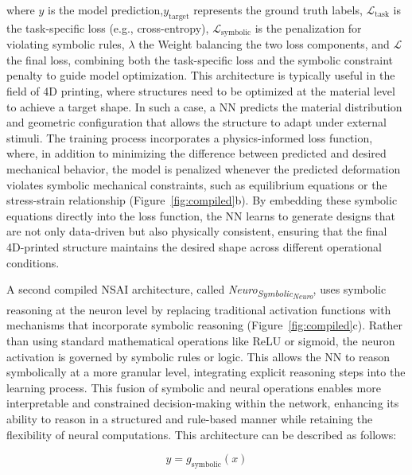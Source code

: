 \documentclass[12pt]{article}
\begin{document}
\noindent where $y$ is the model prediction,$y_\text{target}$ represents the ground truth labels, $\mathcal{L}_\text{task}$ is the task-specific loss (e.g., cross-entropy), $\mathcal{L}_\text{symbolic}$ is the penalization for violating symbolic rules, $\lambda$ the Weight balancing the two loss components, and $\mathcal{L}$ the final loss, combining both the task-specific loss and the symbolic constraint penalty to guide model optimization. This architecture is typically useful in the field of 4D printing, where structures need to be optimized at the material level to achieve a target shape. In such a case, a NN predicts the  material distribution and geometric configuration that allows the structure to adapt under external stimuli. The training process incorporates a physics-informed loss function, where, in addition to minimizing the difference between predicted and desired mechanical behavior, the model is penalized whenever the predicted deformation violates symbolic mechanical constraints, such as equilibrium equations or the stress-strain relationship (Figure~\ref{fig:compiled}b). By embedding these symbolic equations directly into the loss function, the NN learns to generate designs that are not only data-driven but also physically consistent, ensuring that the final 4D-printed structure maintains the desired shape across different operational conditions.


A second compiled NSAI architecture, called \textit{Neuro\textsubscript{Symbolic\textsubscript{Neuro}}}, uses symbolic reasoning at the neuron level by replacing traditional activation functions with mechanisms that incorporate symbolic reasoning (Figure~\ref{fig:compiled}c). Rather than using standard mathematical operations like ReLU or sigmoid, the neuron activation is governed by symbolic rules or logic. This allows the NN to reason symbolically at a more granular level, integrating explicit reasoning steps into the learning process. This fusion of symbolic and neural operations enables more interpretable and constrained decision-making within the network, enhancing its ability to reason in a structured and rule-based manner while retaining the flexibility of neural computations. This architecture can be described as follows:

\begin{equation}
 y = g_\text{symbolic}(x)   
\end{equation}
\end{document}
